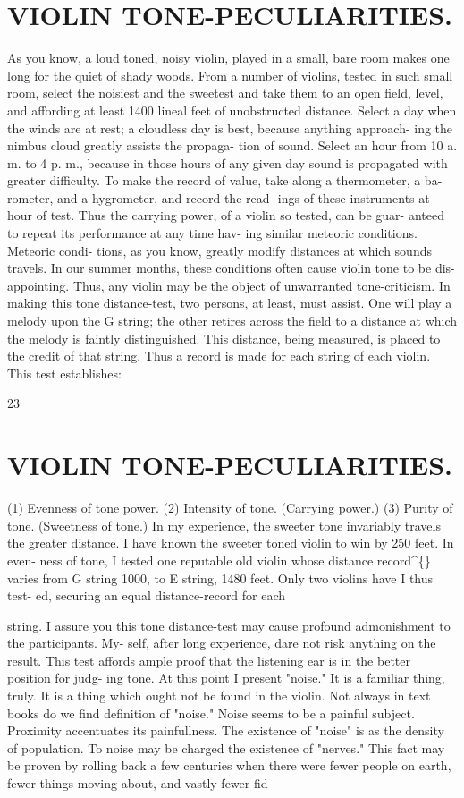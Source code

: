 \documentclass{article}
\begin{document}
\section*{VIOLIN TONE-PECULIARITIES.}
As you know, a loud toned, noisy violin, played in a small, bare room makes one long for the quiet of shady woods. From a number of violins, tested in such small room, select the noisiest and the sweetest and take them to an open field, level, and affording at least 1400 lineal feet of unobstructed distance. Select a day when the winds are at rest; a cloudless day is best, because anything approach- ing the nimbus cloud greatly assists the propaga- tion of sound. Select an hour from 10 a. m. to 4 p. m., because in those hours of any given day sound is propagated with greater difficulty. To make the record of value, take along a thermometer, a ba- rometer, and a hygrometer, and record the read- ings of these instruments at hour of test. Thus the carrying power, of a violin so tested, can be guar- anteed to repeat its performance at any time hav- ing similar meteoric conditions. Meteoric condi- tions, as you know, greatly modify distances at which sounds travels. In our summer months, these conditions often cause violin tone to be dis- appointing. Thus, any violin may be the object of unwarranted tone-criticism. In making this tone distance-test, two persons, at least, must assist. One will play a melody upon the G string; the other retires across the field to a distance at which the melody is faintly distinguished. This distance, being measured, is placed to the credit of that string. Thus a record is made for each string of each violin. This test establishes:

23

\section*{VIOLIN TONE-PECULIARITIES.}
(1) Evenness of tone power. (2) Intensity of tone. (Carrying power.) (3) Purity of tone. (Sweetness of tone.) In my experience, the sweeter tone invariably travels the greater distance. I have known the sweeter toned violin to win by 250 feet. In even- ness of tone, I tested one reputable old violin whose distance record\textasciicircum\{\} varies from G string 1000, to E string, 1480 feet. Only two violins have I thus test- ed, securing an equal distance-record for each

string. I assure you this tone distance-test may cause profound admonishment to the participants. My- self, after long experience, dare not risk anything on the result. This test affords ample proof that the listening ear is in the better position for judg- ing tone. At this point I present "noise." It is a familiar thing, truly. It is a thing which ought not be found in the violin. Not always in text books do we find definition of "noise." Noise seems to be a painful subject. Proximity accentuates its painfullness. The existence of "noise" is as the density of population. To noise may be charged the existence of "nerves." This fact may be proven by rolling back a few centuries when there were fewer people on earth, fewer things moving about, and vastly fewer fid-
\end{document}
